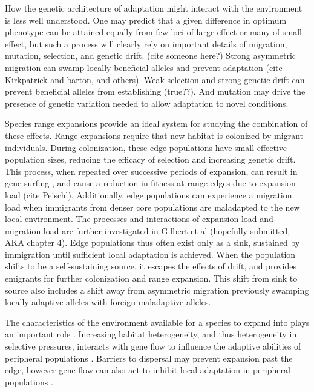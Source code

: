 How the genetic architecture of adaptation might interact with the environment is less well understood. One may predict that a given difference in optimum phenotype can be attained equally from few loci of large effect or many of small effect, but such a process will clearly rely on important details of migration, mutation, selection, and genetic drift. (cite someone here?) Strong asymmetric migration can swamp locally beneficial alleles and prevent adaptation (cite Kirkpatrick and barton, and others). Weak selection and strong genetic drift can prevent beneficial alleles from establishing (true??). And mutation may drive the presence of genetic variation needed to allow adaptation to novel conditions.

Species range expansions provide an ideal system for studying the combination of these effects. Range expansions require that new habitat is colonized by migrant individuals. During colonization, these edge populations have small effective population sizes, reducing the efficacy of selection and increasing genetic drift. This process, when repeated over successive periods of expansion, can result in gene surfing \citep{Klopfstein:2006}, and cause a reduction in fitness at range edges due to expansion load (cite Peischl). Additionally, edge populations can experience a migration load when immigrants from denser core populations are maladapted to the new local environment. The processes and interactions of expansion load and migration load are further investigated in Gilbert et al (hopefully submitted, AKA chapter 4). Edge populations thus often exist only as a sink, sustained by immigration until sufficient local adaptation is achieved. %
When the population shifts to be a self-sustaining source, it escapes the effects of drift, and provides emigrants for further colonization and range expansion. This shift from sink to source also includes a shift away from asymmetric migration previously swamping locally adaptive alleles with foreign maladaptive alleles.

The characteristics of the environment available for a species to expand into plays an important role \citep{Aguilee:2012, Barton:2001, Pease:1989}. Increasing habitat heterogeneity, and thus heterogeneity in selective pressures, interacts with gene flow to influence the adaptive abilities of peripheral populations \citep{Ronce:2001}. Barriers to dispersal may prevent expansion past the edge, however gene flow can also act to inhibit local adaptation in peripheral populations \citep{Slatkin:1987,Kirkpatrick:1997}. 

